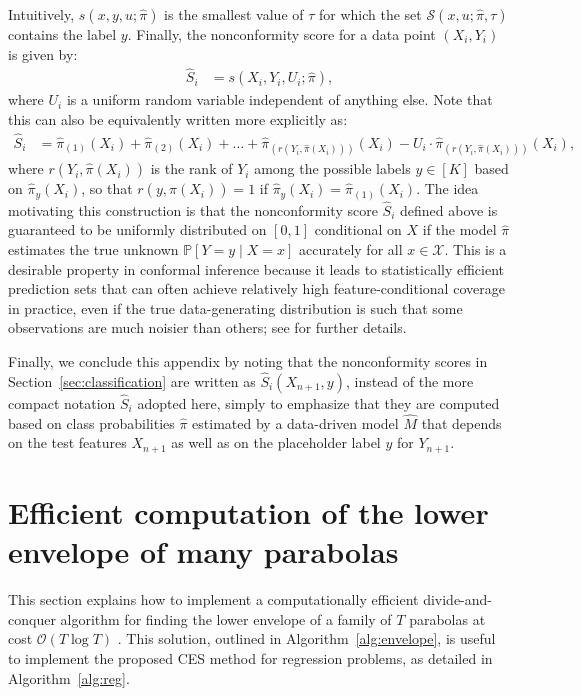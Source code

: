 Intuitively, $s(x,y,u;\hat{\pi})$ is the smallest value of $\tau$ for which the set $\mathcal{S}(x, u ; \hat{\pi}, \tau)$ contains the label $y$.
Finally, the nonconformity score for a data point $(X_i,Y_i)$ is given by:
\begin{align}
  \hat{S}_i
  & = s(X_i,Y_i,U_i;\hat{\pi}),
\end{align}
where $U_i$ is a uniform random variable independent of anything else. Note that this can also be equivalently written more explicitly as:
\begin{align}
  \hat{S}_i
  & = \hat{\pi}_{(1)}(X_i) + \hat{\pi}_{(2)}(X_i) + \ldots + \hat{\pi}_{(r(Y_i,\hat{\pi}(X_i)))}(X_i) - U_i\cdot \hat{\pi}_{(r(Y_i,\hat{\pi}(X_i)))}(X_i),
\end{align}
where $r(Y_i,\hat{\pi}(X_i))$ is the rank of $Y_i$ among the possible labels $y \in [K]$ based on $\hat{\pi}_y(X_i)$, so that $r(y,\hat{\pi}(X_i))=1$ if $\hat{\pi}_{y}(X_i) = \hat{\pi}_{(1)}(X_i)$.
The idea motivating this construction is that the nonconformity score $\hat{S}_i$ defined above is guaranteed to be uniformly distributed on $[0,1]$ conditional on $X$ if the model $\hat{\pi}$ estimates the true unknown $\mathbb{P}[ Y = y \mid X =x]$ accurately for all $x \in \mathcal{X}$.
This is a desirable property in conformal inference because it leads to statistically efficient prediction sets that can often achieve relatively high feature-conditional coverage in practice, even if the true data-generating distribution is such that some observations are much noisier than others; see \citet{romano2020classification} for further details.

Finally, we conclude this appendix by noting that the nonconformity scores in  Section~\ref{sec:classification} are written as $\hat{S}_i(X_{n+1},y)$, instead of the more compact notation $\hat{S}_i$ adopted here, simply to emphasize that they are computed based on class probabilities $\hat{\pi}$ estimated by a data-driven model $\hat{M}$ that depends on the test features $X_{n+1}$ as well as on the placeholder label $y$ for $Y_{n+1}$.

\section{Efficient computation of the lower envelope of many parabolas} \label{app:parabolas}

This section explains how to implement a computationally efficient divide-and-conquer algorithm for finding the lower envelope of a family of $T$ parabolas at cost $\mathcal{O}(T \log T)$ \cite{devillers1995incremental,nielsen1998output}.
This solution, outlined in Algorithm~\ref{alg:envelope}, is useful to implement the proposed CES method for regression problems, as detailed in Algorithm~\ref{alg:reg}.

